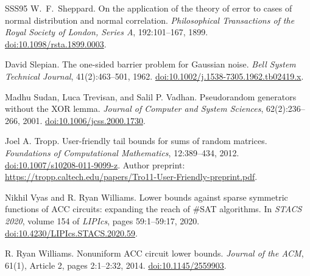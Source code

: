\documentclass[11pt,letterpaper]{article}
\theoremstyle{definition}
\theoremstyle{remark}
\begin{document}
\begin{thebibliography}{SSS95}
W.~F.~Sheppard.
\newblock On the application of the theory of error to cases of normal
  distribution and normal correlation.
\newblock \emph{Philosophical Transactions of the Royal Society of London,
  Series A}, 192:101--167, 1899.
\newblock \href{https://doi.org/10.1098/rsta.1899.0003}{doi:10.1098/rsta.1899.0003}.

David Slepian.
\newblock The one-sided barrier problem for Gaussian noise.
\newblock \emph{Bell System Technical Journal}, 41(2):463--501, 1962.
\newblock \href{https://doi.org/10.1002/j.1538-7305.1962.tb02419.x}{doi:10.1002/j.1538-7305.1962.tb02419.x}.

Madhu Sudan, Luca Trevisan, and Salil P. Vadhan.
\newblock Pseudorandom generators without the XOR lemma.
\newblock \emph{Journal of Computer and System Sciences}, 62(2):236--266, 2001.
\newblock \href{https://doi.org/10.1006/jcss.2000.1730}{doi:10.1006/jcss.2000.1730}.

Joel A. Tropp.
\newblock User-friendly tail bounds for sums of random matrices.
\newblock \emph{Foundations of Computational Mathematics}, 12:389--434, 2012.
\newblock \href{https://doi.org/10.1007/s10208-011-9099-z}{doi:10.1007/s10208-011-9099-z}.
Author preprint: \url{https://tropp.caltech.edu/papers/Tro11-User-Friendly-preprint.pdf}.

Nikhil Vyas and R. Ryan Williams.
\newblock Lower bounds against sparse symmetric functions of ACC circuits: expanding the reach of \#SAT algorithms.
\newblock In \emph{STACS 2020}, volume 154 of \emph{LIPIcs}, pages 59:1--59:17, 2020.
\newblock \href{https://doi.org/10.4230/LIPIcs.STACS.2020.59}{doi:10.4230/LIPIcs.STACS.2020.59}.

R. Ryan Williams.
\newblock Nonuniform ACC circuit lower bounds.
\newblock \emph{Journal of the ACM}, 61(1), Article 2, pages 2:1--2:32, 2014.
\newblock \href{https://doi.org/10.1145/2559903}{doi:10.1145/2559903}.
\end{thebibliography}
\end{document}
